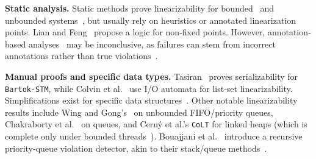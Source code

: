 

\smallskip
\noindent
\textbf{Static analysis.}
Static methods prove linearizability for bounded~\cite{AmRiReSaYa07,MaLeSaRaBe08} and unbounded systems~\cite{BeLeMaRaSa08,Va09,Va10}, but usually rely on heuristics or annotated linearization points.  
	Lian and Feng~\cite{LiFe13} propose a logic for non‐fixed points.  
	However, annotation‐based analyses~\cite{OhRiVeYaYo10,ZhPeHa15,AbJoTr16} may be inconclusive, as failures can stem from incorrect annotations rather than true violations~\cite{BoEmCoHa15}.

\smallskip
\noindent
\textbf{Manual proofs and specific data types.}
Tasiran~\cite{Ta08} proves serializability for \texttt{Bartok-STM}, while Colvin et al.~\cite{CoGrLuMo06} use I/O automata for list‐set linearizability.  
	Simplifications exist for specific data structures~\cite{BoEmEnMu17,FeEnMoRiSh18}.
	Other notable linearizability results include Wing and Gong's~\cite{WiGo93} on unbounded FIFO/priority queues, Chakraborty et al.~\cite{ChHeSeVa15} on queues, and Cerný et al.’s \texttt{CoLT} for linked heaps (which is complete only under bounded threads~\cite{CeRaZuChAl10}).  
	Bouajjani et al.~\cite{BoEnWa17} introduce a recursive priority‐queue violation detector, akin to their stack/queue methods~\cite{BoEmEnHa18}.

